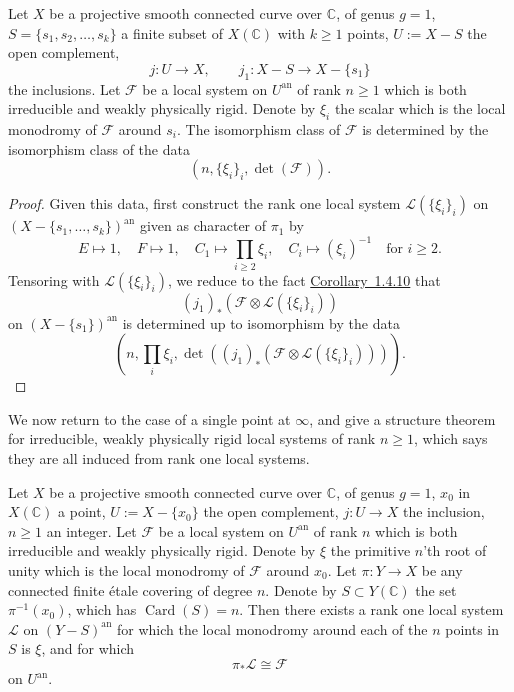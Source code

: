 \setcounter{theorem}{13}
\begin{proposition}
\label{prop:1.4.14}
Let \(X\) be a projective smooth connected curve over \(\mathbb{C}\), of genus
\(g=1\), \(S=\{s_1,s_2,\ldots,s_k\}\) a finite subset of \(X(\mathbb{C})\) with
\(k\geq 1\) points, \(U:=X-S\) the open complement,
\[
  j:U\to X,\qquad j_1:X-S\to X-\{s_1\}
\]
the inclusions. Let \(\mathcal{F}\) be a local system on \(U^{\mathrm{an}}\) of
rank \(n\geq 1\) which is both irreducible and weakly physically rigid. Denote
by \(\xi_i\) the scalar which is the local monodromy of \(\mathcal{F}\) around
\(s_i\). The isomorphism class of \(\mathcal{F}\) is determined by the
isomorphism class of the data
\[
  (n,\{\xi_i\}_i,\det(\mathcal{F})).
\]
\end{proposition}

\begin{proof}
Given this data, first construct the rank one local system
\(\mathcal{L}(\{\xi_i\}_i)\) on \((X-\{s_1,\ldots,s_k\})^{\mathrm{an}}\) given
as character of \(\pi_1\) by
\[
  E\mapsto 1,\quad F\mapsto 1,\quad
  C_1\mapsto\prod_{i\geq 2}\xi_i,\quad
  C_i\mapsto(\xi_i)^{-1}\quad\text{for }i\geq 2.
\]
Tensoring with \(\mathcal{L}(\{\xi_i\}_i)\), we reduce to the fact
\hyperref[cor:1.4.10]{Corollary~1.4.10} that
\[
  (j_1)_*(\mathcal{F}\otimes\mathcal{L}(\{\xi_i\}_i))
\]
on \((X-\{s_1\})^{\mathrm{an}}\) is determined up to isomorphism by the data
\[
  (n,\prod_i\xi_i,\det((j_1)_*(\mathcal{F}\otimes\mathcal{L}(\{\xi_i\}_i)))).
\]
\end{proof}

We now return to the case of a single point at \(\infty\), and give a structure
theorem for irreducible, weakly physically rigid local systems of rank
\(n\geq 1\), which says they are all induced from rank one local systems.

\setcounter{theorem}{15}
\begin{theorem}
\label{thm:1.4.16}
Let \(X\) be a projective smooth connected curve over \(\mathbb{C}\), of genus
\(g=1\), \(x_0\) in \(X(\mathbb{C})\) a point, \(U:=X-\{x_0\}\) the open
complement, \(j:U\to X\) the inclusion, \(n\geq 1\) an integer. Let
\(\mathcal{F}\) be a local system on \(U^{\mathrm{an}}\) of rank \(n\) which is
both irreducible and weakly physically rigid. Denote by \(\xi\) the primitive
\(n\)'th root of unity which is the local monodromy of \(\mathcal{F}\) around
\(x_0\). Let \(\pi:Y\to X\) be any connected finite étale covering of degree
\(n\). Denote by \(S\subset Y(\mathbb{C})\) the set \(\pi^{-1}(x_0)\), which
has \(\operatorname{Card}(S)=n\). Then there exists a rank one local system
\(\mathcal{L}\) on \((Y-S)^{\mathrm{an}}\) for which the local monodromy around
each of the \(n\) points in \(S\) is \(\xi\), and for which
\[
  \pi_*\mathcal{L}\cong\mathcal{F}
\]
on \(U^{\mathrm{an}}\).
\end{theorem}

